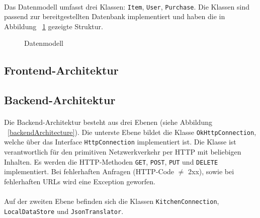 \documentclass{scrartcl}
\begin{document}
			\paragraph*{}
			Das Datenmodell umfasst drei Klassen: \texttt{Item}, \texttt{User}, \texttt{Purchase}. Die Klassen sind passend zur bereitgestellten Datenbank implementiert und haben die in Abbildung ~\ref{datamodel} gezeigte Struktur.
		
		\begin{figure}[!h]
			\label{datamodel}
			\centering
			\caption{Datenmodell}
		\end{figure}
		
		
		\subsection{Frontend-Architektur} \label{architecture.frontend}
		
		
		\subsection{Backend-Architektur} \label{architecture.backend}
			\paragraph*{}
			Die Backend-Architektur besteht aus drei Ebenen (siehe Abbildung ~\ref{backendArchitecture}). Die unterste Ebene bildet die Klasse \texttt{OkHttpConnection}, welche über das Interface \texttt{HttpConnection} implementiert ist. Die Klasse ist verantwortlich für den primitiven Netzwerkverkehr per HTTP mit beliebigen Inhalten. Es werden die HTTP-Methoden \texttt{GET}, \texttt{POST}, \texttt{PUT} und \texttt{DELETE} implementiert. Bei fehlerhaften Anfragen (HTTP-Code $\neq$ 2xx), sowie bei fehlerhaften URLs wird eine Exception geworfen.
			
			\paragraph*{}
			Auf der zweiten Ebene befinden sich die Klassen \texttt{KitchenConnection}, \texttt{LocalDataStore} und \texttt{JsonTranslator}.
			
\end{document}
